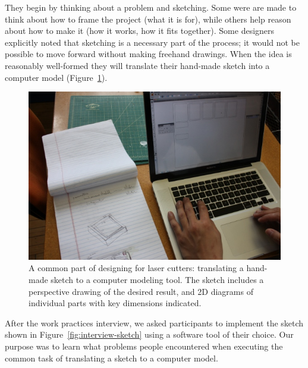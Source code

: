 \documentclass{article}
\begin{document}
They begin by thinking about a problem and sketching. Some were are
made to think about how to frame the project (what it is for), while
others help reason about how to make it (how it works, how it fits
together). Some designers explicitly noted that sketching is a
necessary part of the process; it would not be possible to move
forward without making freehand drawings. When the idea is reasonably
well-formed they will translate their hand-made sketch into a computer
model (Figure~\ref{fig:translate}).

\begin{figure}[h]
  \centering
  \includegraphics[width=0.9\linewidth]{img/translate-sketch-to-computer.jpg}
  \caption{A common part of designing for laser cutters: translating a
    hand-made sketch to a computer modeling tool. The sketch includes
    a perspective drawing of the desired result, and 2D diagrams of
    individual parts with key dimensions indicated.}
  \label{fig:translate}
\end{figure}

After the work practices interview, we asked participants to implement
the sketch shown in Figure~\ref{fig:interview-sketch} using a software
tool of their choice. Our purpose was to learn what problems
people encountered when executing the common task of translating a
sketch to a computer model.
\end{document}
